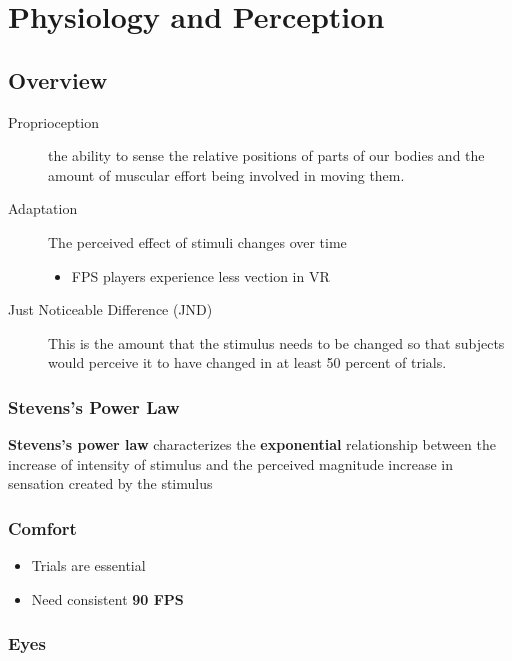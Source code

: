 \chapter{Physiology and Perception}

\section{Overview}

  \begin{description}
    \item[Proprioception] the ability to sense the relative positions
    of parts of our bodies and the amount of muscular effort being
    involved in moving them.
    \item[Adaptation] The perceived effect of stimuli changes over time
    \begin{itemize}
      \item FPS players experience less vection in VR
    \end{itemize}

    \item[Just Noticeable Difference (JND)] This is the amount that the
    stimulus needs to be changed so that subjects
    would perceive it to have changed in at least 50 percent of trials.
  \end{description}

  \subsection{Stevens's Power Law}

    \textbf{Stevens's power law} characterizes the \textbf{exponential}
    relationship between the increase of intensity of stimulus and the
    perceived magnitude increase in sensation created by the stimulus

  \subsection{Comfort}

    \begin{itemize}
      \item Trials are essential
      \item Need consistent \textbf{90 FPS}
    \end{itemize}

  \subsection{Eyes}

